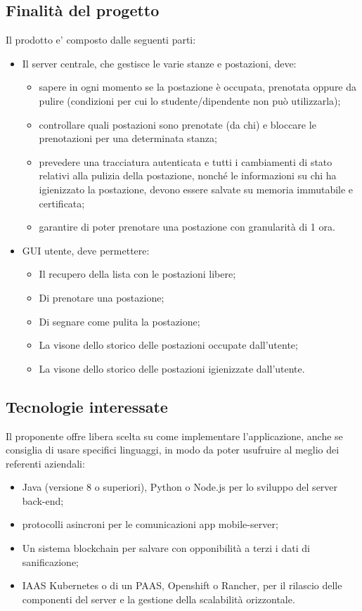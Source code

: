\subsection{Finalità del progetto}
Il prodotto e' composto dalle seguenti parti:
\begin{itemize}
\item Il server centrale, che gestisce le varie stanze e postazioni, deve:
\begin{itemize}
\item sapere in ogni momento se la postazione è occupata, prenotata oppure da pulire (condizioni per cui
lo studente/dipendente non può utilizzarla);
\item controllare quali postazioni sono prenotate (da chi) e bloccare le prenotazioni per una determinata stanza;
\item prevedere una tracciatura autenticata e tutti i cambiamenti di stato relativi alla pulizia della
postazione, nonché le informazioni su chi ha igienizzato la postazione, devono essere salvate su
memoria immutabile e certificata;
\item garantire di poter prenotare una postazione con granularità di 1 ora.
\end{itemize}
\item GUI utente, deve permettere:
\begin{itemize}
\item Il recupero della lista con le postazioni libere;
\item Di prenotare una postazione;
\item Di segnare come pulita la postazione;
\item La visone dello storico delle postazioni occupate dall'utente;
\item La visone dello storico delle postazioni igienizzate dall'utente.
\end{itemize}
\end{itemize}

\subsection{Tecnologie interessate}
Il proponente offre libera scelta su come implementare l'applicazione, anche se consiglia di usare specifici linguaggi, in modo da poter usufruire al meglio dei referenti aziendali:
\begin{itemize}
\item Java (versione 8 o superiori), Python o Node.js per lo sviluppo del server back-end;
\item protocolli asincroni per le comunicazioni app mobile-server;
\item Un sistema blockchain per salvare con opponibilità a terzi i dati di sanificazione;
\item IAAS Kubernetes o di un PAAS, Openshift o Rancher, per il rilascio delle componenti del server e la
gestione della scalabilità orizzontale.
\end{itemize}

